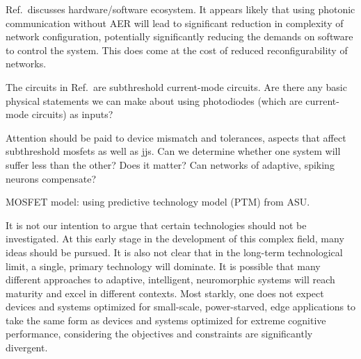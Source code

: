\documentclass[twocolumn]{article}
\begin{document}
Ref.\,\cite{chst2014} discusses hardware/software ecosystem. It appears likely that using photonic communication without AER will lead to significant reduction in complexity of network configuration, potentially significantly reducing the demands on software to control the system. This does come at the cost of reduced reconfigurability of networks.

The circuits in Ref.\,\cite{chst2014} are subthreshold current-mode circuits. Are there any basic physical statements we can make about using photodiodes (which are current-mode circuits) as inputs?

Attention should be paid to device mismatch and tolerances, aspects that affect subthreshold mosfets as well as jjs. Can we determine whether one system will suffer less than the other? Does it matter? Can networks of adaptive, spiking neurons compensate?

MOSFET model: using predictive technology model (PTM) from ASU.

It is not our intention to argue that certain technologies should not be investigated. At this early stage in the development of this complex field, many ideas should be pursued. It is also not clear that in the long-term technological limit, a single, primary technology will dominate. It is possible that many different approaches to adaptive, intelligent, neuromorphic systems will reach maturity and excel in different contexts. Most starkly, one does not expect devices and systems optimized for small-scale, power-starved, edge applications to take the same form as devices and systems optimized for extreme cognitive performance, considering the objectives and constraints are significantly divergent. 
\end{document}
